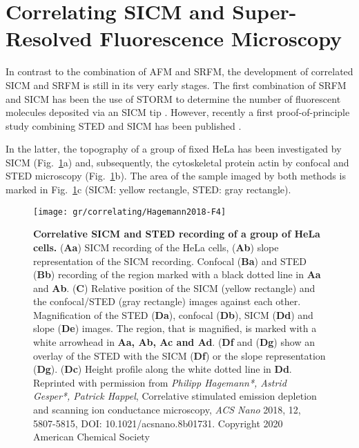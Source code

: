 \section{Correlating SICM and Super-Resolved Fluorescence Microscopy}
\label{sec:correlating-sicm-and-srfm}

In contrast to the combination of AFM and SRFM, the development of correlated
SICM and SRFM is still in its very early stages. The first combination of SRFM
and SICM has been the use of STORM to determine the number of fluorescent
molecules deposited via an SICM tip \cite{Hennig2015}. However, recently a
first proof-of-principle study combining STED and SICM has been published
\cite{Hagemann2018}.

In the latter, the topography of a group of fixed HeLa has been investigated by SICM
(Fig.~\ref{fig:SICM_STED1}a) and, subsequently, the cytoskeletal protein actin by 
confocal and STED microscopy (Fig.~\ref{fig:SICM_STED1}b). The area of the
sample imaged by both methods is marked in Fig.~\ref{fig:SICM_STED1}c (SICM: yellow 
rectangle, STED: gray rectangle). 



\begin{figure}	
  \centering
    \texttt{[image: gr/correlating/Hagemann2018-F4]}
      \caption{
      \textbf{Correlative SICM and STED recording of a group of HeLa cells.} 
      (\textbf{Aa}) SICM recording of the HeLa cells, (\textbf{Ab}) slope representation of the
      SICM recording. Confocal (\textbf{Ba}) and STED (\textbf{Bb}) recording of the region marked 
      with a black dotted line in \textbf{Aa} and \textbf{Ab}. (\textbf{C}) Relative position of 
      the SICM (yellow rectangle) and the confocal/STED (gray rectangle) images against each 
      other. Magnification of the STED (\textbf{Da}), confocal (\textbf{Db}), SICM (\textbf{Dd}) 
      and slope (\textbf{De}) images. The region, that is magnified, is marked with a white 
      arrowhead in \textbf{Aa, Ab, Ac and Ad}. (\textbf{Df} and (\textbf{Dg}) show an overlay of 
      the STED with the SICM (\textbf{Df}) or the slope representation (\textbf{Dg}). 
      (\textbf{Dc}) Height profile along the white dotted line in \textbf{Dd}. \newline Reprinted 
      with permission from \emph{Philipp Hagemann*, Astrid Gesper*, Patrick Happel}, Correlative 
      stimulated emission depletion and scanning ion conductance microscopy, \emph{ACS Nano} 2018, 
      12, 5807-5815, DOI: 10.1021/acsnano.8b01731. Copyright 2020 American Chemical Society}
  \label{fig:SICM_STED1}
\end{figure}

